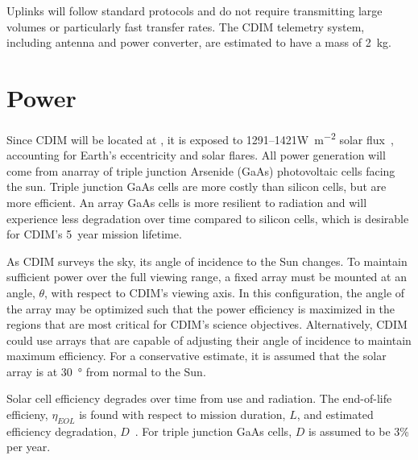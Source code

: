 \documentclass{ws-jai}
\begin{document}
Uplinks will follow standard protocols and do not require transmitting large volumes or particularly fast transfer rates.
The CDIM telemetry system, including antenna and power converter, are estimated to have a mass of \SI{2}{kg}.

\section{Power}
\label{sec:power}
Since CDIM will be located at \Ltwo, it is exposed to 1291--1421\si{\watt\per\meter\squared} solar flux~\cite{evans2002natural}, accounting for Earth's eccentricity and solar flares.
All power generation will come from anarray of triple junction Arsenide (GaAs) photovoltaic cells facing the sun.
Triple junction GaAs cells are more costly than silicon cells, but are more efficient.
An array GaAs cells is more resilient to radiation and will experience less degradation over time compared to silicon cells, which is desirable for CDIM's \SI{5}{year} mission lifetime.

As CDIM surveys the sky, its angle of incidence to the Sun changes.
To maintain sufficient power over the full viewing range, a fixed array must be mounted at an angle, $\theta$, with respect to CDIM's viewing axis.
In this configuration, the angle of the array may be optimized such that the power efficiency is maximized in the regions that are most critical for CDIM's science objectives.
Alternatively, CDIM could use arrays that are capable of adjusting their angle of incidence to maintain maximum efficiency.
For a conservative estimate, it is assumed that the solar array is at \SI{30}{\degree} from normal to the Sun.


Solar cell efficiency degrades over time from use and radiation.
The end-of-life efficieny, $\eta_{EOL}$ is found with respect to mission duration, $L$, and estimated efficiency degradation, $D$~\cite{smad2015}.
For triple junction GaAs cells, $D$ is assumed to be 3\% per year.
\end{document}
